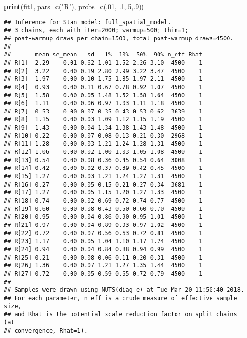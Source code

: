 \documentclass[11pt,]{article}
\newenvironment{Shaded}{\begin{snugshade}}{\end{snugshade}}
\newcommand{\KeywordTok}[1]{\textcolor[rgb]{0.13,0.29,0.53}{\textbf{#1}}}
\newcommand{\DataTypeTok}[1]{\textcolor[rgb]{0.13,0.29,0.53}{#1}}
\newcommand{\DecValTok}[1]{\textcolor[rgb]{0.00,0.00,0.81}{#1}}
\newcommand{\StringTok}[1]{\textcolor[rgb]{0.31,0.60,0.02}{#1}}
\newcommand{\NormalTok}[1]{#1}
\begin{document}
\begin{Shaded}
\begin{Highlighting}[]
\KeywordTok{print}\NormalTok{(fit1, }\DataTypeTok{pars=}\KeywordTok{c}\NormalTok{(}\StringTok{"R"}\NormalTok{), }\DataTypeTok{probs=}\KeywordTok{c}\NormalTok{(.}\DecValTok{01}\NormalTok{, .}\DecValTok{1}\NormalTok{,.}\DecValTok{5}\NormalTok{,.}\DecValTok{9}\NormalTok{))}
\end{Highlighting}
\end{Shaded}

\begin{verbatim}
## Inference for Stan model: full_spatial_model.
## 3 chains, each with iter=2000; warmup=500; thin=1; 
## post-warmup draws per chain=1500, total post-warmup draws=4500.
## 
##       mean se_mean   sd   1%  10%  50%  90% n_eff Rhat
## R[1]  2.29    0.01 0.62 1.01 1.52 2.26 3.10  4500    1
## R[2]  3.22    0.00 0.19 2.80 2.99 3.22 3.47  4500    1
## R[3]  1.97    0.00 0.10 1.75 1.85 1.97 2.11  4500    1
## R[4]  0.93    0.00 0.11 0.67 0.78 0.92 1.07  4500    1
## R[5]  1.58    0.00 0.05 1.48 1.52 1.58 1.64  4500    1
## R[6]  1.11    0.00 0.06 0.97 1.03 1.11 1.18  4500    1
## R[7]  0.53    0.00 0.07 0.35 0.43 0.53 0.62  3639    1
## R[8]  1.15    0.00 0.03 1.09 1.12 1.15 1.19  4500    1
## R[9]  1.43    0.00 0.04 1.34 1.38 1.43 1.48  4500    1
## R[10] 0.22    0.00 0.07 0.08 0.13 0.21 0.30  2968    1
## R[11] 1.28    0.00 0.03 1.21 1.24 1.28 1.31  4500    1
## R[12] 1.06    0.00 0.02 1.00 1.03 1.05 1.08  4500    1
## R[13] 0.54    0.00 0.08 0.36 0.45 0.54 0.64  3008    1
## R[14] 0.42    0.00 0.02 0.37 0.39 0.42 0.45  4500    1
## R[15] 1.27    0.00 0.03 1.21 1.24 1.27 1.31  4500    1
## R[16] 0.27    0.00 0.05 0.15 0.21 0.27 0.34  3681    1
## R[17] 1.27    0.00 0.05 1.15 1.20 1.27 1.33  4500    1
## R[18] 0.74    0.00 0.02 0.69 0.72 0.74 0.77  4500    1
## R[19] 0.60    0.00 0.08 0.43 0.50 0.60 0.70  4500    1
## R[20] 0.95    0.00 0.04 0.86 0.90 0.95 1.01  4500    1
## R[21] 0.97    0.00 0.04 0.89 0.93 0.97 1.02  4500    1
## R[22] 0.72    0.00 0.07 0.56 0.63 0.72 0.81  4500    1
## R[23] 1.17    0.00 0.05 1.04 1.10 1.17 1.24  4500    1
## R[24] 0.94    0.00 0.04 0.84 0.88 0.94 0.99  4500    1
## R[25] 0.21    0.00 0.08 0.06 0.11 0.20 0.31  4500    1
## R[26] 1.36    0.00 0.07 1.21 1.27 1.35 1.44  4500    1
## R[27] 0.72    0.00 0.05 0.59 0.65 0.72 0.79  4500    1
## 
## Samples were drawn using NUTS(diag_e) at Tue Mar 20 11:50:40 2018.
## For each parameter, n_eff is a crude measure of effective sample size,
## and Rhat is the potential scale reduction factor on split chains (at 
## convergence, Rhat=1).
\end{verbatim}
\end{document}
